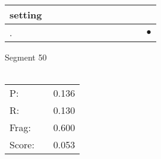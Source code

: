 \documentclass[landscape]{article}
\newcommand{\ssp}{\hspace{2pt}}
\newcommand{\mex}{\cellcolor{g}$\bullet$}
\begin{document}
\begin{tabular}{|l|p{10pt}|p{10pt}|p{10pt}|p{10pt}|p{10pt}|p{10pt}|p{10pt}|p{10pt}|p{10pt}|p{10pt}|p{10pt}|}
\hline
\ssp setting \ssp&\hspace{2pt}&\hspace{2pt}&\hspace{2pt}&\hspace{2pt}&\hspace{2pt}&\hspace{2pt}&\hspace{2pt}&\hspace{2pt}&\hspace{2pt}&\hspace{2pt}&\hspace{2pt}\\
\hline
\ssp \cellcolor{ref10}. \ssp&\hspace{2pt}&\hspace{2pt}&\hspace{2pt}&\hspace{2pt}&\hspace{2pt}&\hspace{2pt}&\hspace{2pt}&\hspace{2pt}&\hspace{2pt}&\hspace{2pt}&\hspace{2pt}\mex\\
\hline
\end{tabular}

\vspace{6pt}
\noindent Segment 50\\\\
\noindent\begin{tabular}{lm{12pt}r}
\hline
P:&&0.136\\
R:&&0.130\\
Frag:&&0.600\\
Score:&&0.053\\
\end{tabular}

\newpage
\end{document}
